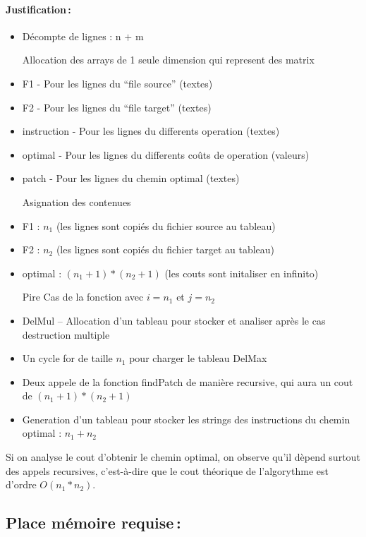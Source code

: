 \documentclass[a4paper, 10pt, french]{article}
\begin{document}
    \paragraph{Justification\,: }


\begin{itemize}
	\item Décompte de lignes : n $+$ m 
	
	Allocation des arrays de 1 seule dimension qui represent des matrix
 	\item F1 \-- Pour les lignes du “file source” (textes)
 	\item F2 \-- Pour les lignes du “file target” (textes)
 	\item instruction \-- Pour les lignes du differents operation (textes)
	\item optimal \-- Pour les lignes du differents coûts de operation (valeurs)
	\item patch \-- Pour les lignes du chemin optimal (textes)
	
	Asignation des contenues
	\item F1 : $n_1$ (les lignes sont copiés du fichier source au tableau)
	\item F2 : $n_2$ (les lignes sont copiés du fichier target au tableau)
	\item optimal : $(n_1+1)*(n_2+1)$ (les couts sont initaliser en infinito)
	
	Pire Cas de la fonction avec $i=n_1$ et $j=n_2$
	\item DelMul – Allocation d'un tableau pour stocker et analiser après le cas destruction multiple
	\item Un cycle for de taille $n_1$ pour charger le tableau DelMax
	\item Deux appele de la fonction findPatch de manière recursive, qui aura un cout de $(n_1+1)*(n_2+1)$
	\item Generation d'un tableau pour stocker les strings des instructions du chemin optimal : $n_1+n_2$

\end{itemize}

	Si on analyse le cout d'obtenir le chemin optimal, on observe qu'il dèpend surtout des appels recursives, c'est-à-dire que le cout théorique de l'algorythme est d'ordre $O(n_1*n_2)$.
    	
  \subsection{Place mémoire requise\,: }
\end{document}
